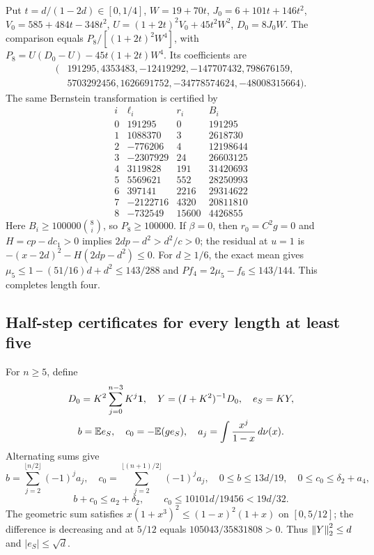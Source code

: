 Put $t=d/(1-2d)\in[0,1/4]$, $W=19+70t$, $J_0=6+101t+146t^2$,
$V_0=585+484t-348t^2$, $U=(1+2t)^2V_0+45t^2W^2$, $D_0=8J_0W$.
The comparison equals $P_8/[(1+2t)^2W^4]$, with
$P_8=U(D_0-U)-45t(1+2t)W^4$. Its coefficients are
\[
\begin{split}
(&191295,4353483,-12419292,-147707432,798676159,\\
 &5703292456,1626691752,-34778574624,-48008315664).
\end{split}
\]
The same Bernstein transformation is certified by
\[
\begin{array}{r|r|r|r}
i&\ell_i&r_i&B_i\\\hline
0&191295&0&191295\\1&1088370&3&2618730\\2&-776206&4&12198644\\
3&-2307929&24&26603125\\4&3119828&191&31420693\\5&5569621&552&28250993\\
6&397141&2216&29314622\\7&-2122716&4320&20811810\\8&-732549&15600&4426855
\end{array}
\]
Here $B_i\ge100000\binom8i$, so $P_8\ge100000$. If $\beta=0$, then ${r_0}=C^2g=0$ and $H=cp-dc_1>0$ implies $2dp-d^2>d^2/c>0$; the residual at $u=1$ is $-(x-2d)^2-H(2dp-d^2)\le0$.
For $d\ge1/6$, the exact mean gives
$\mu_5\le1-(51/16)d+d^2\le143/288$ and $Pf_4=2\mu_5-f_6\le143/144$.
This completes length four.

\subsection{Half-step certificates for every length at least five}
For $n\ge5$, define
\[
 \begin{gathered}
 D_0=K^2\sum_{j=0}^{n-3}K^j\mathbf1,\quad
 Y=(I+K^2)^{-1}D_0,\quad e_S=KY,\\
 b=\mathbb E e_S,\quad c_0=-\mathbb E(ge_S),\quad
 a_j=\int\frac{x^j}{1-x}\,d\nu(x).
 \end{gathered}
\]
Alternating sums give
\[
 b=\sum_{j=2}^{\lfloor n/2\rfloor}(-1)^ja_j,\quad
 c_0=\sum_{j=2}^{\lfloor(n+1)/2\rfloor}(-1)^ja_j,\quad
 0\le b\le13d/19,\quad 0\le c_0\le \delta_{2}+a_4,
\]
\[
 b+c_0\le a_2+\delta_{2},\qquad c_0\le10101d/19456<19d/32.
\]
The geometric sum satisfies $x(1+x^3)^2\le(1-x)^2(1+x)$ on $[0,5/12]$; the difference is decreasing and at $5/12$ equals $105043/35831808>0$. Thus $\left\lVert Y\right\rVert_2^2\le d$ and $|e_S|\le\sqrt d$.

